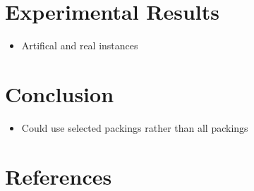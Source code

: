 \documentclass{elsarticle}
\begin{document}
\section{Experimental Results}
\begin{itemize}
	\item Artifical and real instances
\end{itemize}

\section{Conclusion}
\begin{itemize}
	\item Could use selected packings rather than all packings
\end{itemize}


\section*{References}

\end{document}
